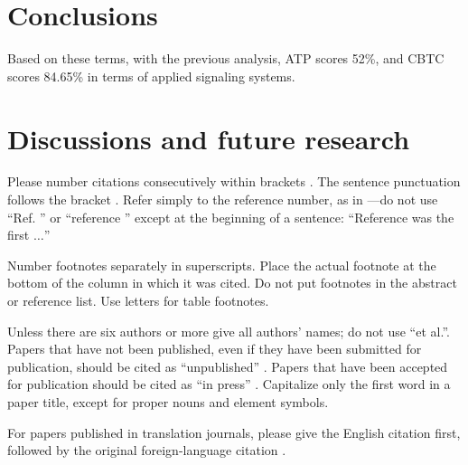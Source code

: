 \documentclass[conference]{IEEEtran}
\begin{document}

\section{Conclusions}

 Based on these terms, with the previous analysis, ATP scores 52\%, and CBTC scores 84.65\% in terms of applied signaling systems.


\section*{Discussions and future research}

Please number citations consecutively within brackets \cite{b1}. The 
sentence punctuation follows the bracket \cite{b2}. Refer simply to the reference 
number, as in \cite{b3}---do not use ``Ref. \cite{b3}'' or ``reference \cite{b3}'' except at 
the beginning of a sentence: ``Reference \cite{b3} was the first $\ldots$''

Number footnotes separately in superscripts. Place the actual footnote at 
the bottom of the column in which it was cited. Do not put footnotes in the 
abstract or reference list. Use letters for table footnotes.

Unless there are six authors or more give all authors' names; do not use 
``et al.''. Papers that have not been published, even if they have been 
submitted for publication, should be cited as ``unpublished'' \cite{b4}. Papers 
that have been accepted for publication should be cited as ``in press'' \cite{b5}. 
Capitalize only the first word in a paper title, except for proper nouns and 
element symbols.

For papers published in translation journals, please give the English 
citation first, followed by the original foreign-language citation \cite{b6}.
\end{document}
